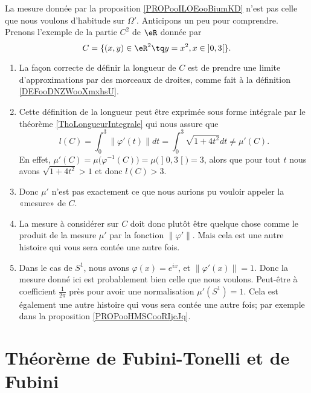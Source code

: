 \begin{remark}     \label{REMooOMYYooNFiKOs}
	La mesure donnée par la proposition \ref{PROPooILOEooBiumKD} n'est pas celle que nous voulons d'habitude sur \( \Omega'\). Anticipons un peu pour comprendre. Prenons l'exemple de la partie \( C^2\) de \( \eR\) donnée par
	\begin{equation}
		C=\{ (x,y)\in \eR^2\tq y=x^2,x\in \mathopen] 0 , 3 \mathclose[ \}.
	\end{equation}
	\begin{enumerate}
		\item
		      La façon correcte de définir la longueur de \( C\) est de prendre une limite d'approximations par des morceaux de droites, comme fait à la définition \ref{DEFooDNZWooXmxhsU}.
		\item
		      Cette définition de la longueur peut être exprimée sous forme intégrale par le théorème \ref{ThoLongueurIntegrale} qui nous assure que
		      \begin{equation}
			      l(C)=\int_0^3\| \varphi'(t) \|dt=\int_0^3\sqrt{ 1+4t^2 }dt\neq \mu'(C).
		      \end{equation}
		      En effet, \( \mu'(C)=\mu\big( \varphi^{-1}(C) \big)=\mu\big( \mathopen] 0 , 3 \mathclose[ \big)=3\), alors que pour tout \( t\) nous avons \( \sqrt{ 1+4t^2 }>1\) et donc \( l(C)>3\).
		\item
		      Donc \( \mu'\) n'est pas exactement ce que nous aurions pu vouloir appeler la «mesure» de \( C\).
		\item
		      La mesure à considérer sur \( C\) doit donc plutôt être quelque chose comme le produit de la mesure \( \mu'\) par la fonction \( \| \varphi' \|\). Mais cela est une autre histoire qui vous sera contée une autre fois.
		\item       \label{ITEMooJTKCooYQknqo}
		      Dans le cas de \( S^1\), nous avons \( \varphi(x)= e^{ix}\), et \( \| \varphi'(x) \|=1\). Donc la mesure donné ici est probablement bien celle que nous voulons. Peut-être à coefficient \( \frac{1}{ 2\pi }\) près pour avoir une normalisation \( \mu'(S^1)=1\). Cela est également une autre histoire qui vous sera contée une autre fois; par exemple dans la proposition \ref{PROPooHMSCooRIjcJq}.
	\end{enumerate}
\end{remark}

\section{Théorème de Fubini-Tonelli et de Fubini}

